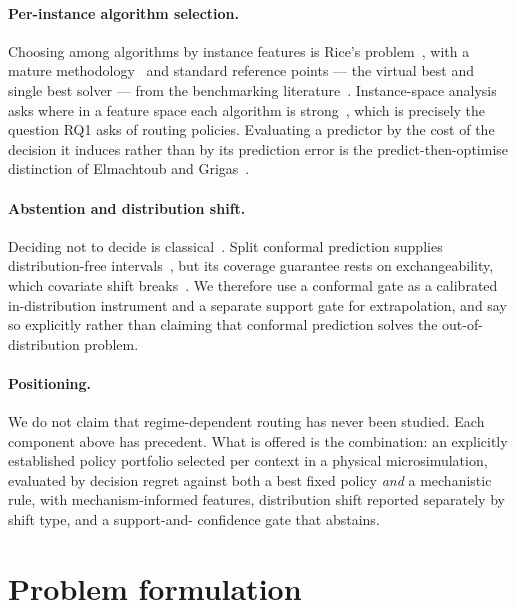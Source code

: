 \paragraph{Per-instance algorithm selection.} Choosing among algorithms by
instance features is Rice's problem~\cite{rice1976}, with a mature
methodology~\cite{xu2008satzilla,smithmiles2009,kotthoff2014survey} and
standard reference points --- the virtual best and single best solver --- from
the benchmarking literature~\cite{bischl2016aslib}. Instance-space analysis
asks where in a feature space each algorithm is
strong~\cite{smithmiles2014instance}, which is precisely the question RQ1 asks
of routing policies. Evaluating a predictor by the cost of the decision it
induces rather than by its prediction error is the predict-then-optimise
distinction of Elmachtoub and Grigas~\cite{elmachtoub2022spo}.

\paragraph{Abstention and distribution shift.} Deciding not to decide is
classical~\cite{chow1970reject}. Split conformal prediction supplies
distribution-free intervals~\cite{vovk2005alrw,lei2018conformal}, but its
coverage guarantee rests on exchangeability, which covariate shift
breaks~\cite{shimodaira2000,tibshirani2019covshift}. We therefore use a
conformal gate as a calibrated in-distribution instrument and a separate
support gate for extrapolation, and say so explicitly rather than claiming
that conformal prediction solves the out-of-distribution problem.

\paragraph{Positioning.} We do not claim that regime-dependent routing has
never been studied. Each component above has precedent. What is offered is the
combination: an explicitly established policy portfolio selected per context in
a physical microsimulation, evaluated by decision regret against both a best
fixed policy \emph{and} a mechanistic rule, with mechanism-informed features,
distribution shift reported separately by shift type, and a support-and-
confidence gate that abstains.

\section{Problem formulation}

